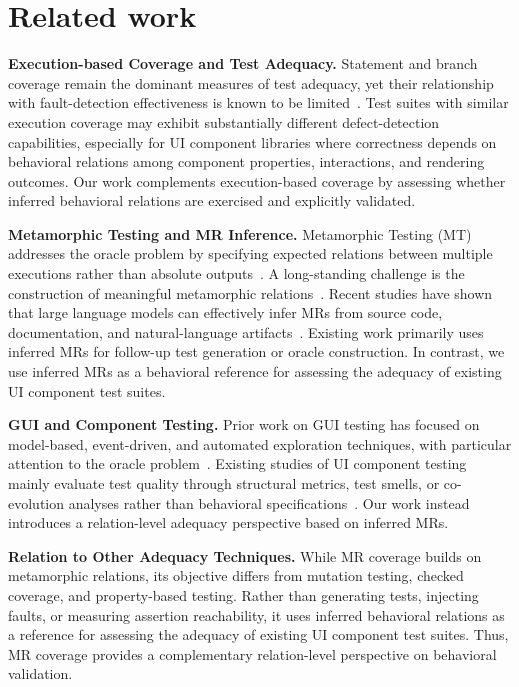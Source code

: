\section{Related work}\label{sec:related_work}

\noindent\textbf{Execution-based Coverage and Test Adequacy.}
Statement and branch coverage remain the dominant measures of test adequacy, yet their relationship with fault-detection effectiveness is known to be limited~\cite{papadakis2019mutation, soremekun2023evaluating,inozemtseva2014coverage,gopinath2014code}. Test suites with similar execution coverage may exhibit substantially different defect-detection capabilities, especially for UI component libraries where correctness depends on behavioral relations among component properties, interactions, and rendering outcomes. Our work complements execution-based coverage by assessing whether inferred behavioral relations are exercised and explicitly validated.

\vspace{2pt}
\noindent\textbf{Metamorphic Testing and MR Inference.}
Metamorphic Testing (MT) addresses the oracle problem by specifying expected relations between multiple executions rather than absolute outputs~\cite{chen2020metamorphic, segura2016survey, liu2013effectively}. A long-standing challenge is the construction of meaningful metamorphic relations~\cite{chen2018metamorphic}. Recent studies have shown that large language models can effectively infer MRs from source code, documentation, and natural-language artifacts~\cite{NolascoMDGGPUAF24,zhang2023automated,shin2024towards, ayerdi2024genmorph, duque2024selecting, le2025can, ma2025specgen}. Existing work primarily uses inferred MRs for follow-up test generation or oracle construction. In contrast, we use inferred MRs as a behavioral reference for assessing the adequacy of existing UI component test suites.

\vspace{2pt}
\noindent\textbf{GUI and Component Testing.}
Prior work on GUI testing has focused on model-based, event-driven, and automated exploration techniques, with particular attention to the oracle problem~\cite{memon2001hierarchical,xie2007designing,barr2014oracle,wang2020combodroid,wang2021vet,ahlgren2021testing}. Existing studies of UI component testing mainly evaluate test quality through structural metrics, test smells, or co-evolution analyses rather than behavioral specifications~\cite{spadini2018relation,rwemalika2023smells}. Our work instead introduces a relation-level adequacy perspective based on inferred MRs.

\vspace{2pt}
\noindent\textbf{Relation to Other Adequacy Techniques.}
While MR coverage builds on metamorphic relations, its objective differs from mutation testing, checked coverage, and property-based testing. Rather than generating tests, injecting faults, or measuring assertion reachability, it uses inferred behavioral relations as a reference for assessing the adequacy of existing UI component test suites. Thus, MR coverage provides a complementary relation-level perspective on behavioral validation.